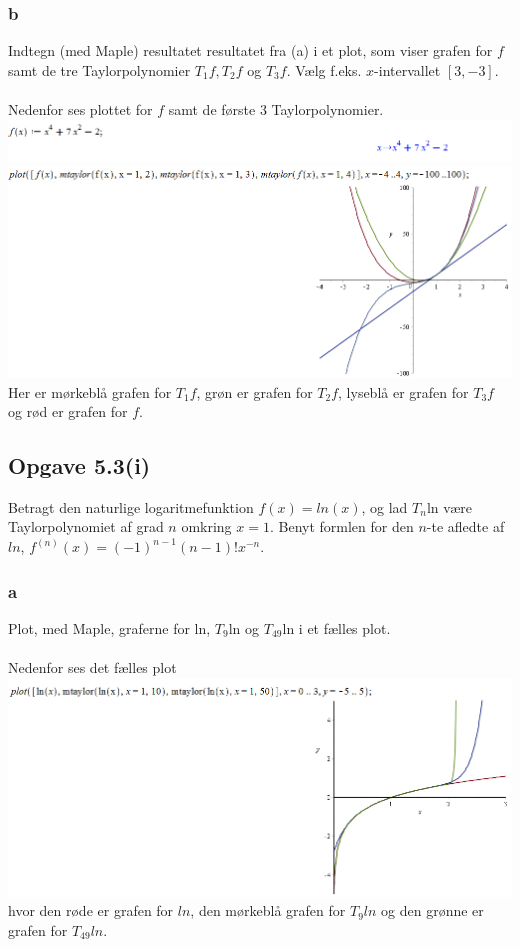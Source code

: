 \documentclass[12pt]{article}
\begin{document}
\subsubsection*{b}
Indtegn (med Maple) resultatet resultatet fra (a) i et plot, som viser grafen for $f$ samt de tre Taylorpolynomier $T_1f, T_2f$ og $T_3f$. Vælg f.eks. $x$-intervallet $[3,-3]$.\\
\\
Nedenfor ses plottet for $f$ samt de første 3 Taylorpolynomier.\\
\includegraphics[scale=0.6]{Pic3}\\
\includegraphics[scale=0.6]{Pic1}\\
Her er mørkeblå grafen for $T_1f$, grøn er grafen for $T_2f$, lyseblå er grafen for $T_3f$ og rød er grafen for $f$.

\newpage

\subsection*{Opgave 5.3(i)}
Betragt den naturlige logaritmefunktion $f(x)=ln(x)$, og lad $T_n$ln være Taylorpolynomiet af grad $n$ omkring $x=1$. Benyt formlen for den $n$-te afledte af $ln$, $f^{(n)}(x)=(-1)^{n-1}(n-1)!x^{-n}$.

\subsubsection*{a}
Plot, med Maple, graferne for ln, $T_9$ln og $T_{49}$ln i et fælles plot.\\
\\
Nedenfor ses det fælles plot\\
\includegraphics[scale=0.6]{Pic4}\\
hvor den røde er grafen for $ln$, den mørkeblå grafen for $T_9ln$ og den grønne er grafen for $T_{49}ln$.
\end{document}
